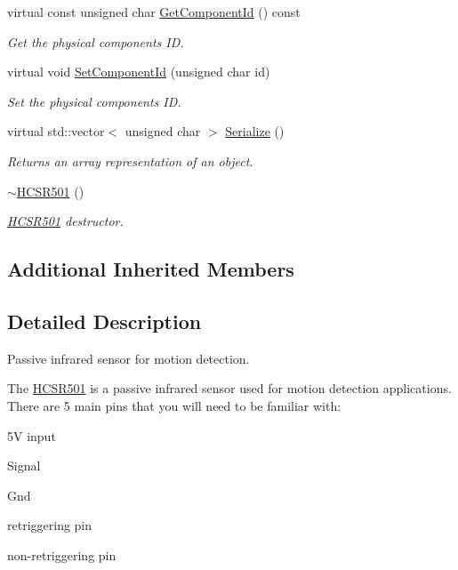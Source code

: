 \begin{DoxyCompactItemize}
virtual const unsigned char \hyperlink{classrbp_1_1HCSR501_a144ca65c1248656a016564493d59fe47}{Get\+Component\+Id} () const 
\begin{DoxyCompactList}\small\item\em Get the physical component\textquotesingle{}s I\+D. \end{DoxyCompactList}\item 
virtual void \hyperlink{classrbp_1_1HCSR501_a12e4d4dbdfce36157af3042fe65cbb50}{Set\+Component\+Id} (unsigned char id)
\begin{DoxyCompactList}\small\item\em Set the physical component\textquotesingle{}s I\+D. \end{DoxyCompactList}\item 
virtual std\+::vector$<$ unsigned char $>$ \hyperlink{classrbp_1_1HCSR501_a6aa46721ed0dcba774435a24ac17072e}{Serialize} ()
\begin{DoxyCompactList}\small\item\em Returns an array representation of an object. \end{DoxyCompactList}\item 
\hypertarget{classrbp_1_1HCSR501_a9ba22950944715359016ed2f81e5a9ea}{}\hyperlink{classrbp_1_1HCSR501_a9ba22950944715359016ed2f81e5a9ea}{$\sim$\+H\+C\+S\+R501} ()\label{classrbp_1_1HCSR501_a9ba22950944715359016ed2f81e5a9ea}

\begin{DoxyCompactList}\small\item\em \hyperlink{classrbp_1_1HCSR501}{H\+C\+S\+R501} destructor. \end{DoxyCompactList}\end{DoxyCompactItemize}
\subsection*{Additional Inherited Members}


\subsection{Detailed Description}
Passive infrared sensor for motion detection. 

The \hyperlink{classrbp_1_1HCSR501}{H\+C\+S\+R501} is a passive infrared sensor used for motion detection applications. There are 5 main pins that you will need to be familiar with\+:


\begin{DoxyItemize}
\item 5\+V input
\item Signal
\item Gnd
\item retriggering pin
\item non-\/retriggering pin
\end{DoxyItemize}

